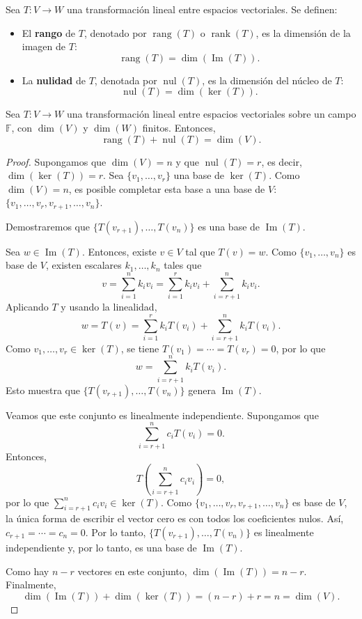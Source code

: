 \begin{definition}
Sea $T: V \to W$ una transformación lineal entre espacios vectoriales. Se definen:

\begin{itemize}
    \item El \textbf{rango} de $T$, denotado por $\operatorname{rang}(T)$ o $\operatorname{rank}(T)$, es la dimensión de la imagen de $T$:
    \[
    \operatorname{rang}(T) = \dim(\operatorname{Im}(T)).
    \]
    \item La \textbf{nulidad} de $T$, denotada por $\operatorname{nul}(T)$, es la dimensión del núcleo de $T$:
    \[
    \operatorname{nul}(T) = \dim(\ker(T)).
    \]
\end{itemize}
\end{definition}


\begin{theorem}\label{teodim}
Sea $T: V \to W$ una transformación lineal entre espacios vectoriales sobre un campo $\mathbb{F}$, con $\dim(V)$ y $\dim(W)$ finitos. Entonces,
\[
\operatorname{rang}(T) + \operatorname{nul}(T) = \dim(V).
\]
\begin{proof}
Supongamos que $\dim(V) = n$ y que $\operatorname{nul}(T) = r$, es decir, $\dim(\ker(T)) = r$. Sea $\{v_1, \ldots, v_r\}$ una base de $\ker(T)$. Como $\dim(V) = n$, es posible completar esta base a una base de $V$: $\{v_1, \ldots, v_r, v_{r+1}, \ldots, v_n\}$.

Demostraremos que $\{T(v_{r+1}), \ldots, T(v_n)\}$ es una base de $\operatorname{Im}(T)$.

Sea $w \in \operatorname{Im}(T)$. Entonces, existe $v \in V$ tal que $T(v) = w$. Como $\{v_1, \ldots, v_n\}$ es base de $V$, existen escalares $k_1, \ldots, k_n$ tales que
\[
v = \sum_{i=1}^n k_i v_i = \sum_{i=1}^r k_i v_i + \sum_{i=r+1}^n k_i v_i.
\]
Aplicando $T$ y usando la linealidad,
\[
w = T(v) = \sum_{i=1}^r k_i T(v_i) + \sum_{i=r+1}^n k_i T(v_i).
\]
Como $v_1, \ldots, v_r \in \ker(T)$, se tiene $T(v_1) = \cdots = T(v_r) = 0$, por lo que
\[
w = \sum_{i=r+1}^n k_i T(v_i).
\]
Esto muestra que $\{T(v_{r+1}), \ldots, T(v_n)\}$ genera $\operatorname{Im}(T)$.

Veamos que este conjunto es linealmente independiente. Supongamos que
\[
\sum_{i=r+1}^n c_i T(v_i) = 0.
\]
Entonces,
\[
T\left(\sum_{i=r+1}^n c_i v_i\right) = 0,
\]
por lo que $\sum_{i=r+1}^n c_i v_i \in \ker(T)$. Como $\{v_1, \ldots, v_r, v_{r+1}, \ldots, v_n\}$ es base de $V$, la única forma de escribir el vector cero es con todos los coeficientes nulos. Así, $c_{r+1} = \cdots = c_n = 0$. Por lo tanto, $\{T(v_{r+1}), \ldots, T(v_n)\}$ es linealmente independiente y, por lo tanto, es una base de $\operatorname{Im}(T)$.

Como hay $n-r$ vectores en este conjunto, $\dim(\operatorname{Im}(T)) = n - r$. Finalmente,
\[
\dim(\operatorname{Im}(T)) + \dim(\ker(T)) = (n - r) + r = n = \dim(V).
\]
\end{proof}
\end{theorem}



